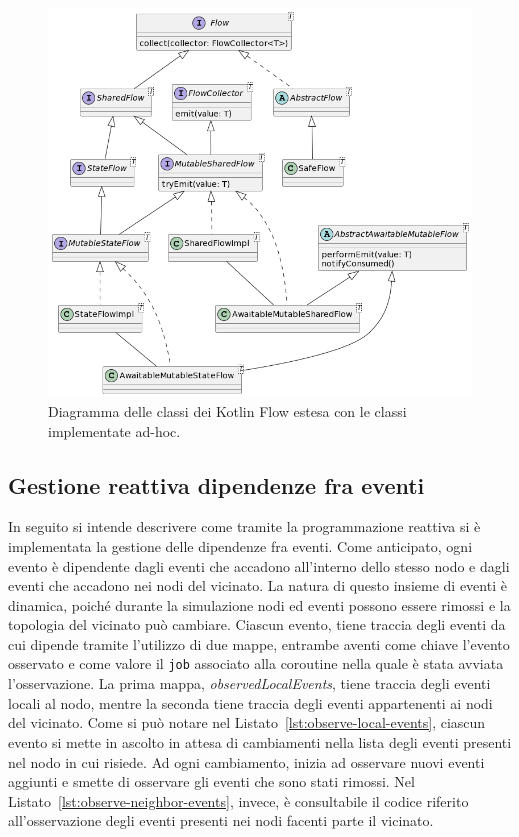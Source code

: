 \documentclass[12pt,a4paper,openright,twoside]{book}
\begin{document}
\begin{figure}
    \centering
    \includegraphics[width=\linewidth]{figures/implementation/extended-flow.png}
    \caption{Diagramma delle classi dei Kotlin Flow estesa con le classi implementate ad-hoc.}
    \label{fig:extended-flow}
\end{figure}



\subsection{Gestione reattiva dipendenze fra eventi}
In seguito si intende descrivere come tramite la programmazione reattiva si è implementata la gestione delle dipendenze fra eventi. 
Come anticipato, ogni evento è dipendente dagli eventi che accadono all'interno dello stesso nodo e dagli eventi che accadono nei nodi del vicinato. La natura di questo insieme di eventi è dinamica, poiché durante la simulazione nodi ed eventi possono essere rimossi e la topologia del vicinato può cambiare. 
Ciascun evento, tiene traccia degli eventi da cui dipende tramite l'utilizzo di due mappe, entrambe aventi come chiave l'evento osservato e come valore il \texttt{job} associato alla coroutine nella quale è stata avviata l'osservazione. La prima mappa, \textit{observedLocalEvents}, tiene traccia degli eventi locali al nodo, mentre la seconda tiene traccia degli eventi appartenenti ai nodi del vicinato. 
Come si può notare nel Listato~\ref{lst:observe-local-events}, ciascun evento si mette in ascolto in attesa di cambiamenti nella lista degli eventi presenti nel nodo in cui risiede. Ad ogni cambiamento, inizia ad osservare nuovi eventi aggiunti e smette di osservare gli eventi che sono stati rimossi. 
Nel Listato~\ref{lst:observe-neighbor-events}, invece, è consultabile il codice riferito all'osservazione degli eventi presenti nei nodi facenti parte il vicinato.
\end{document}
